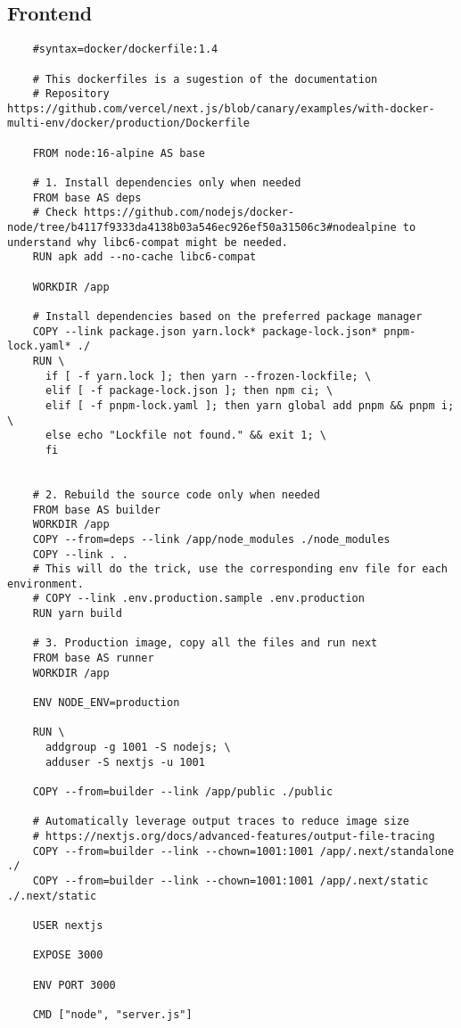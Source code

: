 \subsection{Frontend}\label{frontendDockerfile}
\begin{Verbatim}
    #syntax=docker/dockerfile:1.4

    # This dockerfiles is a sugestion of the documentation
    # Repository https://github.com/vercel/next.js/blob/canary/examples/with-docker-multi-env/docker/production/Dockerfile
    
    FROM node:16-alpine AS base
    
    # 1. Install dependencies only when needed
    FROM base AS deps
    # Check https://github.com/nodejs/docker-node/tree/b4117f9333da4138b03a546ec926ef50a31506c3#nodealpine to understand why libc6-compat might be needed.
    RUN apk add --no-cache libc6-compat
    
    WORKDIR /app
    
    # Install dependencies based on the preferred package manager
    COPY --link package.json yarn.lock* package-lock.json* pnpm-lock.yaml* ./
    RUN \
      if [ -f yarn.lock ]; then yarn --frozen-lockfile; \
      elif [ -f package-lock.json ]; then npm ci; \
      elif [ -f pnpm-lock.yaml ]; then yarn global add pnpm && pnpm i; \
      else echo "Lockfile not found." && exit 1; \
      fi
    
    
    # 2. Rebuild the source code only when needed
    FROM base AS builder
    WORKDIR /app
    COPY --from=deps --link /app/node_modules ./node_modules
    COPY --link . .
    # This will do the trick, use the corresponding env file for each environment.
    # COPY --link .env.production.sample .env.production
    RUN yarn build
    
    # 3. Production image, copy all the files and run next
    FROM base AS runner
    WORKDIR /app
    
    ENV NODE_ENV=production
    
    RUN \
      addgroup -g 1001 -S nodejs; \
      adduser -S nextjs -u 1001
    
    COPY --from=builder --link /app/public ./public
    
    # Automatically leverage output traces to reduce image size
    # https://nextjs.org/docs/advanced-features/output-file-tracing
    COPY --from=builder --link --chown=1001:1001 /app/.next/standalone ./
    COPY --from=builder --link --chown=1001:1001 /app/.next/static ./.next/static
    
    USER nextjs
    
    EXPOSE 3000
    
    ENV PORT 3000
    
    CMD ["node", "server.js"]
\end{Verbatim}


